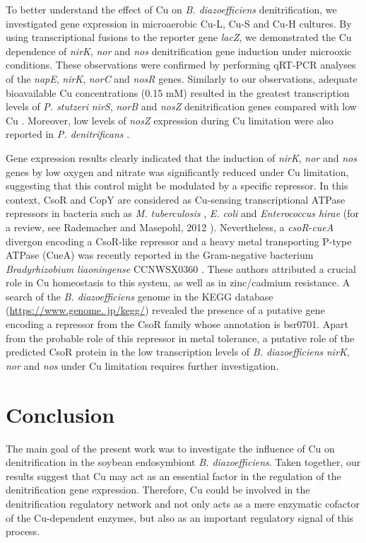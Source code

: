 \documentclass[a4paper,11pt]{article}
\begin{document}
To better understand the effect of Cu on {\em B. diazoefficiens} denitrification, we investigated
gene expression in microaerobic Cu-L, Cu-S and Cu-H cultures. By using transcriptional fusions to the reporter gene {\em lacZ}, we demonstrated the Cu dependence of {\em nirK}, {\em nor} and {\em nos} denitrification
gene induction under microoxic conditions. These observations were confirmed by
performing qRT-PCR analyses of the {\em napE}, {\em nirK}, {\em norC} and {\em nosR} genes. Similarly to our
observations, adequate bioavailable Cu concentrations (0.15 mM) resulted in the greatest
transcription levels of {\em P. stutzeri} {\em nirS}, {\em norB} and {\em nosZ} denitrification genes compared with
low Cu \cite{black2016influence}. Moreover, low levels of {\em nosZ} expression during Cu limitation were also
reported in {\em P. denitrificans} \cite{sullivan2013copper}.

Gene expression results clearly indicated that the induction of {\em nirK}, {\em nor} and {\em nos} genes
by low oxygen and nitrate was significantly reduced under Cu limitation, suggesting
that this control might be modulated by a specific repressor. In this context, CsoR and
CopY are considered as Cu-sensing transcriptional ATPase repressors in bacteria such
as {\em M. tuberculosis} \cite{liu2007csor}, {\em E. coli} and {\em Enterococcus hirae} (for a review, see Rademacher and
Masepohl, 2012 \cite{rademacher2012copper}). Nevertheless, a {\em csoR}-{\em cueA} divergon encoding a CsoR-like repressor
and a heavy metal transporting P-type ATPase (CueA) was recently reported in the
Gram-negative bacterium {\em Bradyrhizobium liaoningense} CCNWSX0360 \cite{liu2007csor}. These authors
attributed a crucial role in Cu homeostasis to this system, as well as in zinc/cadmium resistance.
A search of the {\em B. diazoefficiens} genome in the KEGG database (\url{https://www.genome.
jp/kegg/}) revealed the presence of a putative gene encoding a
repressor from the CsoR family whose annotation is bsr0701. Apart from the probable role
of this repressor in metal tolerance, a putative role of the predicted CsoR protein in the
low transcription levels of {\em B. diazoefficiens} {\em nirK}, {\em nor} and {\em nos} under Cu limitation requires
further investigation.

\section{Conclusion}
The main goal of the present work was to investigate the influence of Cu on denitrification
in the soybean endosymbiont {\em B. diazoefficiens}. Taken together, our results suggest that
Cu may
act as an essential factor in the regulation of the denitrification gene expression. Therefore, Cu could be involved in the denitrification regulatory network and
not only acts as a mere enzymatic cofactor of the Cu-dependent enzymes, but also as an
important regulatory signal of this process.



\end{document}
